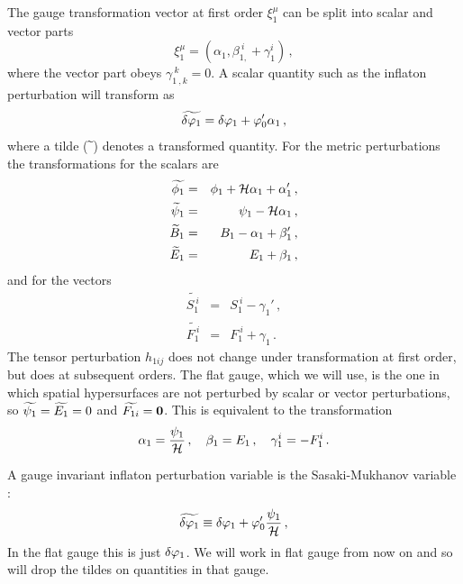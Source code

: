 The gauge transformation vector at first order  $\xi_1^\mu$ can be split into
scalar
and vector parts
% 
\begin{equation}
\label{eq:xidefn-intro}
 \xi_1^\mu = (\alpha_1, \beta_{1,}^{~i} + \gamma_1^i)\,,
\end{equation}
% 
where the vector part obeys $\gamma_{1~,k}^{~k}=0$. A scalar quantity such as
the inflaton perturbation will transform as \cite{Malik:2008im, Malik:2008yp}
% 
\begin{equation}
 \label{eq:dphitransform-intro}
 \widetilde{\delta\varphi_{1}} = \delta\varphi_{1} + \varphi_0' \alpha_1\,,
\end{equation}
where a tilde ($\widetilde{~}$) denotes a transformed quantity. For the metric
perturbations the
transformations for the scalars are
\begin{eqnarray}
 \label{transphi1}
\widetilde {\phi_1} &=& \phi_1 +\H\alpha_1+\alpha_1'\,,\\
%
\label{transpsi1}
\widetilde \psi_1 &=& \psi_1-\H\alpha_1 \,,\\
%
\label{transB1}
\widetilde B_1 &=& B_1-\alpha_1+\beta_1'\,,\\
%
\label{transE1}
\widetilde E_1 &=& E_1+\beta_1\,,
\end{eqnarray}
and for the vectors
\begin{eqnarray}
 \label{transS1}
\widetilde {S_{1}^{~i}} &=& S_{1}^{~i}-\gamma_1'\,, \\
%
\label{transF1}
\widetilde {F_{1}^{~i}} &=& F_{1}^{~i}+\gamma_1\,. 
\end{eqnarray}
% 
The tensor perturbation $h_{1ij}$ does not change under transformation at first
order, but does at subsequent orders.
The flat gauge, which we will use, is the one in which spatial hypersurfaces
are not perturbed by scalar or vector perturbations, so $\widetilde{\psi_1} = \widetilde{E_1}
=0$ and $\widetilde{F_{1i}} = \textbf{0}$.  This is equivalent to the transformation
% 
\begin{equation}
 \alpha_1 = \frac{\psi_1}{\mathcal{H}}\,,\quad \beta_1=E_1 \,, \quad \gamma^i_1 =
-F^i_1\,.
\end{equation}

A gauge invariant inflaton perturbation variable is the Sasaki-Mukhanov
variable \cite{Mukhanov:1990me, Mukhanov:1988jd,
Sasaki:1986hm}:
% 
\begin{equation}
\label{eq:flatdvp1-intro}
 \widetilde{\delta\varphi_{1}} \equiv \delta\varphi_{1} + \varphi_0'\frac{\psi_1}{\mathcal{H}}\,,
\end{equation}
% 
In the flat gauge this is just $\delta\varphi_{1}$. We will work in flat
gauge from now on and so will drop the tildes on quantities in that gauge.

